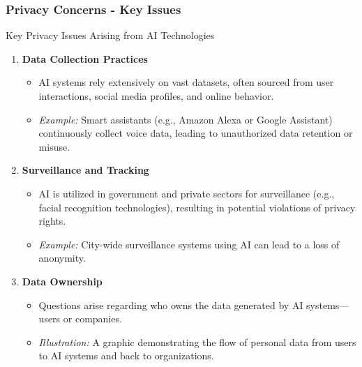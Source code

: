 \documentclass[aspectratio=169]{beamer}
\begin{document}
\begin{frame}[fragile]
    \frametitle{Privacy Concerns - Key Issues}
    \begin{block}{Key Privacy Issues Arising from AI Technologies}
        \begin{enumerate}
            \item \textbf{Data Collection Practices}
            \begin{itemize}
                \item AI systems rely extensively on vast datasets, often sourced from user interactions, social media profiles, and online behavior.
                \item \textit{Example:} Smart assistants (e.g., Amazon Alexa or Google Assistant) continuously collect voice data, leading to unauthorized data retention or misuse.
            \end{itemize}
            
            \item \textbf{Surveillance and Tracking}
            \begin{itemize}
                \item AI is utilized in government and private sectors for surveillance (e.g., facial recognition technologies), resulting in potential violations of privacy rights.
                \item \textit{Example:} City-wide surveillance systems using AI can lead to a loss of anonymity.
            \end{itemize}
            
            \item \textbf{Data Ownership}
            \begin{itemize}
                \item Questions arise regarding who owns the data generated by AI systems—users or companies.
                \item \textit{Illustration:} A graphic demonstrating the flow of personal data from users to AI systems and back to organizations.
            \end{itemize}
        \end{enumerate}
    \end{block}
\end{frame}
\end{document}

